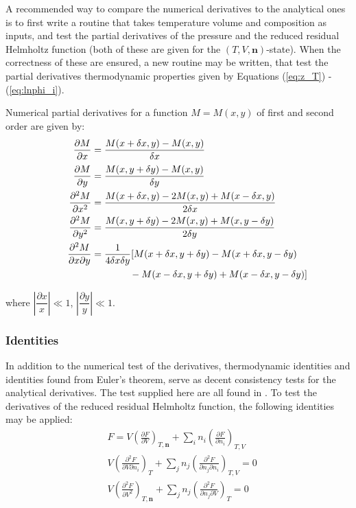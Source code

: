 \documentclass[internal,english]{sintefmemo2012}
\numberwithin{equation}{section}
\newcommand*{\pd}[2]{\frac{\partial #1}{\partial #2}}
\newcommand*{\pdd}[2]{\frac{\partial^2 #1}{\partial #2^2}}
\newcommand*{\pder}[2]{\left(\frac{\partial #1}{\partial #2}\right)}
\newcommand*{\pdder}[2]{\left(\frac{\partial^2 #1}{\partial #2^2}\right)}
\newcommand*{\pdcross}[3]{\left(\frac{\partial^2 #1}{\partial #2 \partial #3}\right)}
\newcommand*{\reff}[1]{(\ref{#1})}
\begin{document}
A recommended way to compare the numerical derivatives to the analytical ones is to first write a routine that takes temperature volume and composition as inputs, and test the partial derivatives of the pressure and the reduced residual Helmholtz function (both of these are given for the $(T,V,\textbf{n})$-state). When the correctness of these are ensured, a new routine may be written, that test the partial derivatives thermodynamic properties given by Equations \reff{eq:z_T} - \reff{eq:lnphi_i}.

Numerical partial derivatives for a function $M = M(x,y)$ of first and second order are given by:
\begin{align}
  \phantom{\frac{\partial^2 M}{\partial x \partial y}}
    \label{eq:numDir1}
	\pd{M}{x} & = \frac{M(x + \delta x,y) - M(x ,y)}{\delta x } \\
	\pd{M}{y} & = \frac{M(x ,y+ \delta y) - M(x ,y)}{\delta y } \\
	\pdd{M}{x} & = \frac{M(x + \delta x,y) - 2 M(x ,y) + M(x - \delta x,y)}{2 \delta x} \\
	\pdd{M}{y} & = \frac{M(x ,y+ \delta y) - 2 M(x ,y) + M(x ,y- \delta y)}{2 \delta y} \\
  & \begin{aligned}
    \label{eq:numDir5}
    \mathllap{\frac{\partial^2 M}{\partial x \partial y}}
	 & = \frac{1}{4 \delta x \delta y} [M(x + \delta x,y + \delta y)- M(x + \delta x,y - \delta y) \\
	 & \qquad \qquad - M(x - \delta x,y + \delta y) + M(x - \delta x,y - \delta y) ]
  \end{aligned}
\end{align}

where $\left| \dfrac{\partial x}{x} \right| \ll 1$,  $\left|\dfrac{\partial y}{y} \right| \ll 1$.
 
\subsubsection*{Identities}  
In addition to the numerical test of the derivatives, thermodynamic identities and identities found from Euler's theorem, serve as decent consistency tests for the analytical derivatives. The test supplied here are all found in \cite{MM}. To test the derivatives of the reduced residual Helmholtz function, the following identities may be applied:
\begin{align}
\label{test:1}
& F = V \pder{F}{V}_{T,\textbf{n}} + \sum_i n_i \pder{F}{n_i}_{T,V} \\
\label{test:2}
& V \pdcross{F}{V}{n_i}_T + \sum_j n_j \pdcross{F}{n_j}{n_i}_{T,V} = 0 \\
\label{test:3}
& V \pdder{F}{V}_{T,\textbf{n}} + \sum_j n_j \pdcross{F}{n_j}{V}_T = 0
\end{align}
\end{document}
